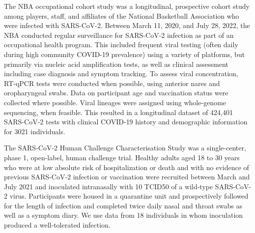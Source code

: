 \documentclass[12pt]{article}
\begin{document}
The NBA occupational cohort study was a longitudinal, prospective cohort study among players, staff, and affiliates of the National Basketball Association who were infected with SARS-CoV-2. Between March 11, 2020, and July 28, 2022, the NBA conducted regular surveillance for SARS-CoV-2 infection as part of an occupational health program. This included frequent viral testing (often daily during high community COVID-19 prevalence) using a variety of platforms, but primarily via nucleic acid amplification tests, as well as clinical assessment including case diagnosis and symptom tracking. To assess viral concentration, RT-qPCR tests were conducted when possible, using anterior nares and oropharyngeal swabs. Data on participant age and vaccination status were collected where possible. Viral lineages were assigned using whole-genome sequencing, when feasible. This resulted in a longitudinal dataset of 424,401 SARS-CoV-2 tests with clinical COVID-19 history and demographic information for 3021 individuals.

The SARS-CoV-2 Human Challenge Characterisation Study was a single-center, phase 1, open-label, human challenge trial. Healthy adults aged 18 to 30 years who were at low absolute risk of hospitalization or death and with no evidence of previous SARS-CoV-2 infection or vaccination were recruited between March and July 2021 and inoculated intranasally with 10 TCID50 of a wild-type SARS-CoV-2 virus. Participants were housed in a quarantine unit and prospectively followed for the length of infection and completed twice daily nasal and throat swabs as well as a symptom diary. We use data from 18 individuals in whom inoculation produced a well-tolerated infection. 
\end{document}
